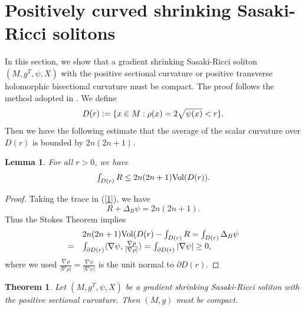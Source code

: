 \documentclass[12pt]{amsart}%
\newtheorem{theorem}{Theorem}
\newtheorem{lemma}{Lemma}
\numberwithin{equation}{section}
\begin{document}
\section{Positively curved shrinking Sasaki-Ricci solitons}

In this section, we show that a gradient shrinking Sasaki-Ricci soliton
$(M,g^{T},\psi,X)$ with the positive sectional curvature or positive
transverse holomorphic bisectional curvature must be compact. The proof
follows the method adopted in \cite{mw2}. We define%
\[%
\begin{array}
[c]{c}%
D(r):=\{x\in M:\rho(x)=2\sqrt{\psi(x)}<r\}.
\end{array}
\]
Then we have the following estimate that the average of the scalar curvature
over $D(r)$ is bounded by $2n(2n+1).$

\begin{lemma}
For all $r>0$, we have%
\begin{equation}%
\begin{array}
[c]{c}%
\int_{D(r)}R\leq2n(2n+1)\mathrm{Vol}(D(r)).
\end{array}
\label{40}%
\end{equation}

\end{lemma}

\begin{proof}
Taking the trace in (\ref{1}), we have%
\[
R+\Delta_{B}\psi=2n(2n+1).
\]
Thus the Stokes Theorem implies
\[%
\begin{array}
[c]{ll}
& 2n(2n+1)\mathrm{Vol}(D(r)-\int_{D(r)}R=\int_{D(r)}\Delta_{B}\psi\\
= & \int_{\partial D(r)}\langle\nabla\psi,\frac{\nabla\rho}{|\nabla\rho
|}\rangle=\int_{\partial D(r)}|\nabla\psi|\geq0,
\end{array}
\]
where we used $\frac{\nabla\rho}{|\nabla\rho|}=\frac{\nabla\psi}{|\nabla\psi
|}$ is the unit normal to $\partial D(r).$
\end{proof}

\begin{theorem}
\label{Thm}Let $(M,g^{T},\psi,X)$ be a gradient shrinking Sasaki-Ricci soliton
with the positive sectional curvature. Then $(M,g)$ must be compact.
\end{theorem}
\end{document}

